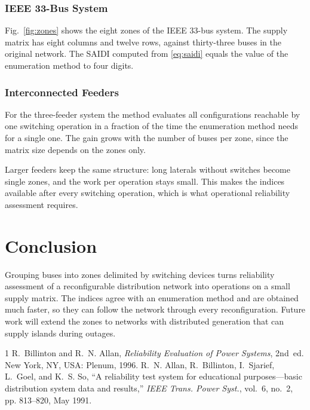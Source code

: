 \documentclass[journal]{IEEEtran}
\begin{document}
\subsubsection{IEEE 33-Bus System}
Fig.~\ref{fig:zones} shows the eight zones of the IEEE 33-bus system. The supply matrix has
eight columns and twelve rows, against thirty-three buses in the original network. The SAIDI
computed from \eqref{eq:saidi} equals the value of the enumeration method to four digits.

\subsubsection{Interconnected Feeders}
For the three-feeder system the method evaluates all configurations reachable by one switching
operation in a fraction of the time the enumeration method needs for a single one. The gain grows
with the number of buses per zone, since the matrix size depends on the zones only.

Larger feeders keep the same structure: long laterals without switches become single zones, and
the work per operation stays small. This makes the indices available after every switching
operation, which is what operational reliability assessment requires.

\section{Conclusion}
Grouping buses into zones delimited by switching devices turns reliability assessment of a
reconfigurable distribution network into operations on a small supply matrix. The indices agree
with an enumeration method and are obtained much faster, so they can follow the network through
every reconfiguration. Future work will extend the zones to networks with distributed generation
that can supply islands during outages.

\begin{thebibliography}{1}
R.~Billinton and R.~N. Allan, \emph{Reliability Evaluation of Power Systems}, 2nd~ed.
New York, NY, USA: Plenum, 1996.
R.~N. Allan, R.~Billinton, I.~Sjarief, L.~Goel, and K.~S. So, ``A reliability test system for
educational purposes---basic distribution system data and results,'' \emph{IEEE Trans. Power
Syst.}, vol.~6, no.~2, pp. 813--820, May 1991.
\end{thebibliography}
\end{document}
